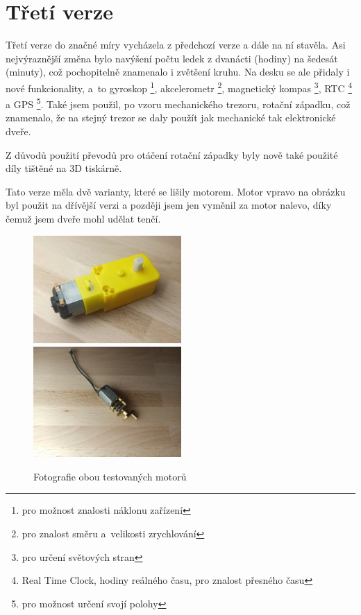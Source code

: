 \section{Třetí verze}
\label{M3-vyvoj}

Třetí verze do značné míry vycházela z předchozí verze a dále na ní stavěla. Asi nejvýraznější změna bylo navýšení počtu 
ledek z dvanácti (hodiny) na šedesát (minuty), což pochopitelně znamenalo i zvětšení kruhu. Na desku se ale přidaly i nové funkcionality,
a~to gyroskop \footnote{pro možnost znalosti náklonu zařízení}, akcelerometr \footnote{pro znalost směru a~velikosti zrychlování}, magnetický kompas \footnote{pro určení světových
stran}, RTC \footnote{Real Time Clock, hodiny reálného času, pro znalost přesného času} a GPS \footnote{pro možnost určení svojí polohy}.
Také jsem použil, po vzoru mechanického trezoru, rotační západku, což znamenalo, že na stejný trezor se daly použít jak mechanické tak 
elektronické dveře.

Z důvodů použití převodů pro otáčení rotační západky byly nově také použité díly tištěné na 3D tiskárně. 

Tato verze měla dvě varianty, které se lišily motorem.
Motor vpravo na obrázku  byl použit na dřívější verzi a později jsem jen vyměnil za motor nalevo, díky čemuž jsem dveře mohl udělat tenčí. %
\begin{figure}[htbp]
    \centering
    \includegraphics[width=160pt]{kapitoly/obrazky/E3/motory/zluty_motor.jpg}
    \includegraphics[width=160pt]{kapitoly/obrazky/E3/motory/hodinovyStrojek.jpg}
    \caption{Fotografie obou testovaných motorů} 
    \label{fig:E3-motory}
\end{figure}

\newpage